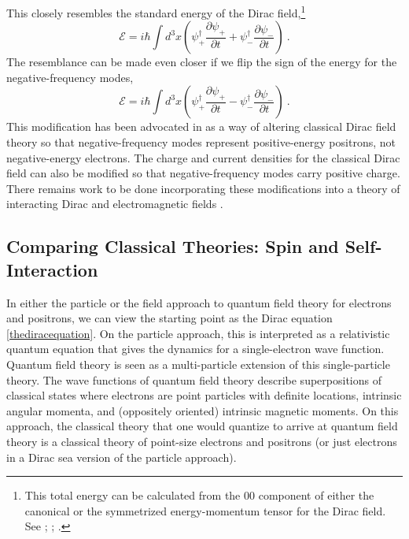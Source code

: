 \documentclass[onecolumn,secnumarabic,amsmath,amssymb,balancelastpage,nofootinbib]{article}
\begin{document}
This closely resembles the standard energy of the Dirac field,\footnote{This total energy can be calculated from the $00$ component of either the canonical or the symmetrized energy-momentum tensor for the Dirac field.  See \citet[pg.\ 419]{heitler}; \citet[pg.\ 219]{schweberQFT}; \citet[eq.\ 3]{positrons}.}
\begin{equation}
\mathcal{E}=i\hbar \int d^3x\left(\psi_+^{\dagger}\frac{\partial \psi_+}{\partial t}+\psi_-^{\dagger}\frac{\partial \psi_-}{\partial t}\right)
\ .
\end{equation}
The resemblance can be made even closer if we flip the sign of the energy for the negative-frequency modes,
\begin{equation}
\mathcal{E}=i\hbar \int d^3x\left(\psi_+^{\dagger}\frac{\partial \psi_+}{\partial t}-\psi_-^{\dagger}\frac{\partial \psi_-}{\partial t}\right)
\ .
\end{equation}
This modification has been advocated in \citet{positrons} as a way of altering classical Dirac field theory so that negative-frequency modes represent positive-energy positrons, not negative-energy electrons.  The charge and current densities for the classical Dirac field can also be modified so that negative-frequency modes carry positive charge.  There remains work to be done incorporating these modifications into a theory of interacting Dirac and electromagnetic fields \citep[sec.\ 5]{potentialenergy}.



\subsection{Comparing Classical Theories: Spin and Self-Interaction}\label{CLASSICALsection}

In either the particle or the field approach to quantum field theory for electrons and positrons, we can view the starting point as the Dirac equation \eqref{thediracequation}.  On the particle approach, this is interpreted as a relativistic quantum equation that gives the dynamics for a single-electron wave function.  Quantum field theory is seen as a multi-particle extension of this single-particle theory.  The wave functions of quantum field theory describe superpositions of classical states where electrons are point particles with definite locations, intrinsic angular momenta, and (oppositely oriented) intrinsic magnetic moments.  On this approach, the classical theory that one would quantize to arrive at quantum field theory is a classical theory of point-size electrons and positrons (or just electrons in a Dirac sea version of the particle approach).
\end{document}

